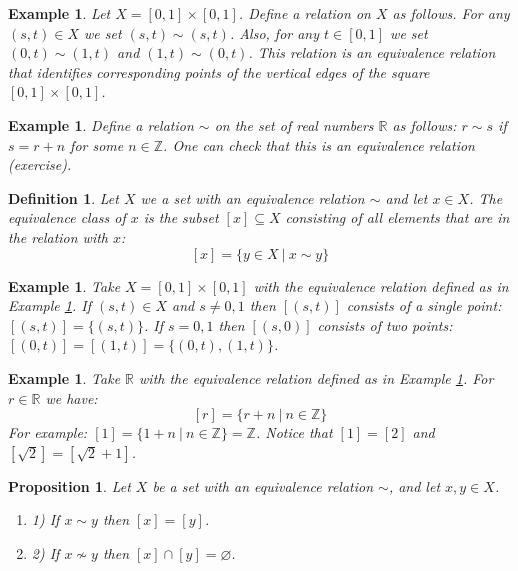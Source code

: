 \documentclass[11pt, letterpaper, oneside]{report}
\theoremstyle{pplain}
\newtheorem{proposition}[theorem]{Proposition}
\newtheorem{ITERMVALUE THM}[theorem]{Intermediate Value Theorem}
\newtheorem{HEINEBOREL THM}[theorem]{Heine-Borel Theorem}
\newtheorem{UMETR THM}[theorem]{Urysohn Metrization Theorem}
\newtheorem{UMETR2 THM}[theorem]{Urysohn Metrization Theorem (v.2)}
\theoremstyle{ddefinition}
\newtheorem{definition}[theorem]{Definition}
\newtheorem{example}[theorem]{Example}
\theoremstyle{nnn}
\newtheorem{TDA NN}[theorem]{Topological Data Analysis. }
\theoremstyle{eexercise}
\newcommand{\Z}{{\mathbb Z}}
\newcommand{\R}{{\mathbb R}}
\newcommand{\benu}{\begin{enumerate}}
\newcommand{\eenu}{\end{enumerate}}
\begin{document}
\begin{example}
\label{EQUIV REL1 EXAMPLE}
Let $X = [0, 1]\times [0, 1]$. Define a relation on $X$ as follows. For any $(s,t)\in X$ we set 
$(s,t)\sim (s,t)$. Also, for any $t\in [0,1]$ we set $(0,t)\sim (1,t)$ and $(1,t)\sim (0,t)$. This relation is 
an equivalence relation that identifies corresponding points of the vertical edges of the square 
$[0, 1]\times [0,1]$.
\end{example}

\begin{example}
\label{EQUIV REL2 EXAMPLE}
Define a relation $\sim$ on the set of real numbers $\R$ as follows: $r\sim s$  if $s = r+n$
for some $n\in \Z$. One can check that this is an equivalence relation (exercise). 
\end{example}

\begin{definition}
Let $X$ we a set with an equivalence relation $\sim$ and let $x\in X$. The \emph{equivalence class}
of $x$ is the subset $[x]\subseteq X$ consisting of all elements that are in the relation with $x$:
$$[x] = \{ y\in X \ | \ x\sim y\}$$ 
\end{definition}

\begin{example}
Take $X= [0,1]\times [0,1]$ with the equivalence relation defined as in Example \ref{EQUIV REL1 EXAMPLE}. 
If $(s, t)\in X$ and $s\neq 0,1$ then $[(s,t)]$ consists of a single point: $[(s,t)] = \{(s,t)\}$. 
If $s = 0,1$ then $[(s,0)]$ consists of two points: $[(0,t)] = [(1,t)] = \{(0,t), (1,t)\}$.  
\end{example}

\begin{example}
Take $\R$ with the equivalence relation defined as in Example \ref{EQUIV REL2 EXAMPLE}. 
For $r\in \R$ we have:
$$[r] = \{r+n \ | \ n\in \Z\}$$
For example: $[1] = \{ 1+n \ | \ n\in \Z \} = \Z$. Notice that $[1] = [2] $ and 
$[\sqrt{2}] = [\sqrt{2}+1]$. 
\end{example}

\begin{proposition}
\label{EQUIV CLASSES PROP}
Let $X$ be a set with an equivalence relation $\sim$, and let  $x, y\in X$. 
\benu
\item[1)] If $x\sim y$ then  $[x]=[y]$.
\item[2)] If $x\not\sim y$ then $[x]\cap [y]  = \varnothing$.
 \eenu
\end{proposition}
\end{document}

